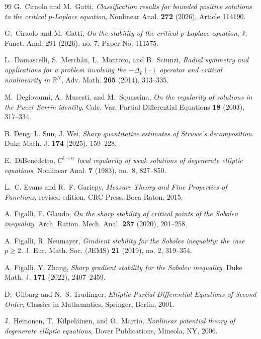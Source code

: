\documentclass[reqno,12pt]{amsart}
\numberwithin{equation}{section}
\theoremstyle{remark}
\begin{document}
\begin{thebibliography}{99}
G.~Ciraolo and M.~Gatti,
\emph{Classification results for bounded positive solutions to the critical $p$-Laplace equation},
Nonlinear Anal. \textbf{272} (2026), Article 114190. 

G.~Ciraolo and M.~Gatti,
\emph{On the stability of the critical p-Laplace equation},
J. Funct. Anal. 291 (2026), no. 7, Paper No. 111575.

L.~Damascelli, S.~Merch\'an, L.~Montoro, and B.~Sciunzi,
\emph{Radial symmetry and applications for a problem involving the
$-\Delta_p(\cdot)$ operator and critical nonlinearity in $\mathbb R^N$},
Adv. Math. \textbf{265} (2014), 313--335.

M.~Degiovanni, A.~Musesti, and M.~Squassina,
\emph{On the regularity of solutions in the Pucci--Serrin identity},
Calc. Var. Partial Differential Equations \textbf{18} (2003), 317--334.

B. Deng, L. Sun, J. Wei, \emph{Sharp quantitative estimates of Struwe's decomposition}. Duke Math. J.
\textbf{174} (2025), 159--228.

E.~DiBenedetto,
\emph{$C^{1+\alpha}$ local regularity of weak solutions of degenerate elliptic equations},
Nonlinear Anal. \textbf{7} (1983), no.~8, 827--850.


L.~C. Evans and R.~F. Gariepy,
\emph{Measure Theory and Fine Properties of Functions},
revised edition, CRC Press, Boca Raton, 2015.

A. Figalli, F. Glaudo, \emph{On the sharp stability of critical points of the Sobolev inequality}. Arch. Ration. Mech. Anal. 
\textbf{237} (2020), 201--258.

A. Figalli, R. Neumayer, \emph{Gradient stability for the Sobolev inequality: the case $p\geq 2$}. J. Eur. Math. Soc. (JEMS) \textbf{21} (2019), no. 2, 319--354.

A. Figalli, Y. Zhang, \emph{Sharp gradient stability for the Sobolev inequality}. Duke Math. J.  \textbf{171}
(2022), 2407–2459.

D.~Gilbarg and N.~S. Trudinger,
\emph{Elliptic Partial Differential Equations of Second Order},
Classics in Mathematics, Springer, Berlin, 2001.

J.~Heinonen, T.~Kilpel{\"a}inen, and O.~Martio, 
\emph{Nonlinear potential theory of degenerate elliptic equations}, Dover Publications, Mineola, NY, 2006.


\end{thebibliography}
\end{document}
